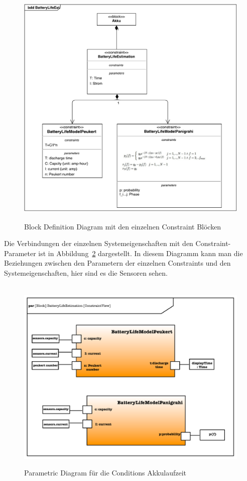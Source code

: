 \begin{figure}[H]
\centering\
\includegraphics[width=14cm]{img/batterybdd}
\caption{Block Definition Diagram mit den einzelnen Constraint Blöcken}
\label{fig:blockBattery}
\end{figure}

Die Verbindungen der einzelnen Systemeigenschaften mit den Constraint-Parameter ist in
Abbildung~\ref{fig:parBattery} dargestellt.
In diesem Diagramm kann man die Beziehungen zwischen den Parametern der einzelnen Constraints und den Systemeigenschaften, hier sind es die Sensoren sehen.

\begin{figure}[H]
\centering\
\includegraphics[width=14cm]{img/batteryParametric}
\caption{Parametric Diagram für die Conditions Akkulaufzeit}
\label{fig:parBattery}
\end{figure}


